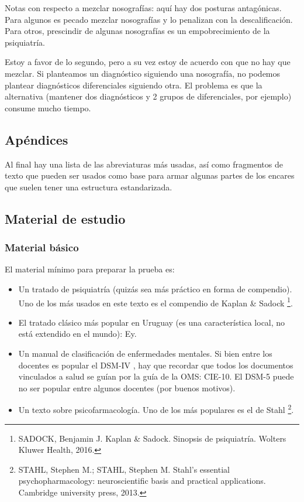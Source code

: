 Notas con respecto a mezclar nosografías: aquí hay dos posturas antagónicas. Para algunos es pecado mezclar nosografías y lo penalizan con la descalificación. Para otros, prescindir de algunas nosografías es un empobrecimiento de la psiquiatría.

Estoy a favor de lo segundo, pero a su vez estoy de acuerdo con que no hay que mezclar. Si planteamos un diagnóstico siguiendo una nosografía, no podemos plantear diagnósticos diferenciales siguiendo otra. El problema es que la alternativa (mantener dos diagnósticos y 2 grupos de diferenciales, por ejemplo) consume mucho tiempo.
\subsection*{Apéndices}
Al final hay una lista de las abreviaturas más usadas, así como fragmentos de texto que pueden ser usados como base para armar algunas partes de los encares que suelen tener una estructura estandarizada.
\subsection*{Material de estudio}
\subsubsection*{Material básico}
El material mínimo para preparar la prueba es:
\begin{itemize}
\item Un tratado de psiquiatría (quizás sea más práctico en forma de compendio). Uno de los más usados en este texto es el compendio de Kaplan \& Sadock \footnote{SADOCK, Benjamin J. Kaplan \& Sadock. Sinopsis de psiquiatría. Wolters Kluwer Health, 2016.}.
\item El tratado clásico más popular en Uruguay (es una característica local, no está extendido en el mundo): Ey\cite{ey1996}.
\item Un manual de clasificación de enfermedades mentales. Si bien entre los docentes es popular el DSM-IV \cite{dsmiv1998}, hay que recordar que todos los documentos vinculados a salud se guían por la guía de la OMS: CIE-10\cite{cie102000}. El DSM-5 puede no ser popular entre algunos docentes (por buenos motivos).
\item Un texto sobre psicofarmacología. Uno de los más populares es el de Stahl \footnote{STAHL, Stephen M.; STAHL, Stephen M. Stahl's essential psychopharmacology: neuroscientific basis and practical applications. Cambridge university press, 2013.}.
\end{itemize}
